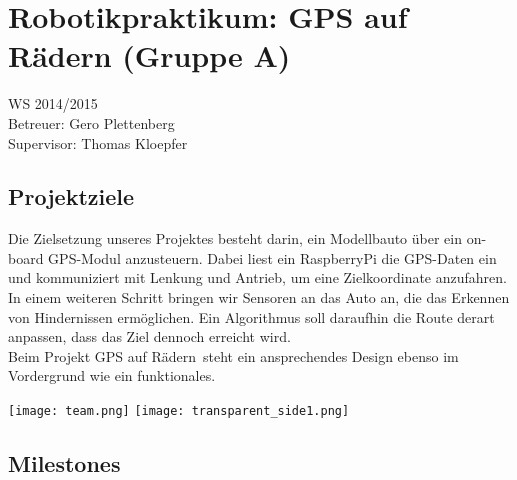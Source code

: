 \documentclass{scrreprt}
\begin{document}
\vspace{-6cm}
\chapter*{Robotikpraktikum: GPS auf Rädern (Gruppe A)}
\vspace{-.25cm}
\begin{center}
WS 2014/2015\\
Betreuer: Gero Plettenberg\\
Supervisor: Thomas Kloepfer
\end{center}
\vspace{-.25cm}
\section{Projektziele}
\vspace{-.25cm}
Die Zielsetzung unseres Projektes besteht darin, ein Modellbauto über ein on-board GPS-Modul anzusteuern. Dabei liest ein RaspberryPi die GPS-Daten ein und kommuniziert mit Lenkung und Antrieb, um eine Zielkoordinate anzufahren.\\
In einem weiteren Schritt bringen wir Sensoren an das Auto an, die das Erkennen von Hindernissen ermöglichen. Ein Algorithmus soll daraufhin die Route derart anpassen, dass das Ziel dennoch erreicht wird.\\
Beim Projekt \glqq GPS auf Rädern\grqq\ steht ein ansprechendes Design ebenso im Vordergrund wie ein funktionales.

\begin{center}
\vspace{-.75cm}
\texttt{[image: team.png]}
\texttt{[image: transparent\_side1.png]}
\end{center}
\vspace{-1cm}
\section{Milestones}
\end{document}
